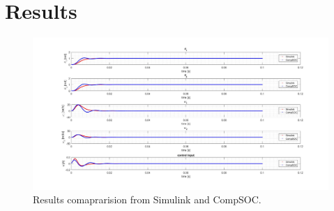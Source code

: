 \section{Results}

\begin{figure}[h]
	\begin{center}
		\includegraphics[width=\linewidth]{img/p400}
		\caption{Results comaprarision from Simulink and CompSOC.}
		\label{fig:p400}
	\end{center}
\end{figure}